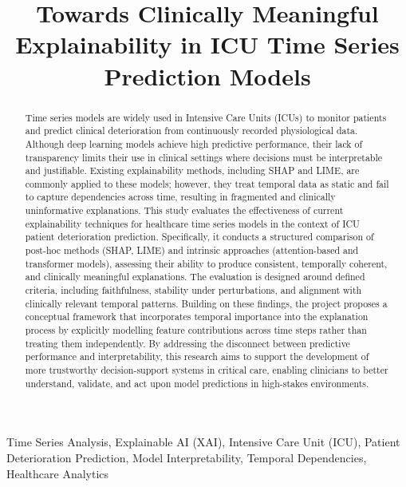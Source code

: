\documentclass[conference]{IEEEtran}
\begin{document}
\title{Towards Clinically Meaningful Explainability in ICU Time Series Prediction Models}

\author{
}

\maketitle

\begin{abstract}
Time series models are widely used in Intensive Care Units (ICUs) to monitor patients and predict clinical deterioration from continuously recorded physiological data. Although deep learning models achieve high predictive performance, their lack of transparency limits their use in clinical settings where decisions must be interpretable and justifiable. Existing explainability methods, including SHAP and LIME, are commonly applied to these models; however, they treat temporal data as static and fail to capture dependencies across time, resulting in fragmented and clinically uninformative explanations.
This study evaluates the effectiveness of current explainability techniques for healthcare time series models in the context of ICU patient deterioration prediction. Specifically, it conducts a structured comparison of post-hoc methods (SHAP, LIME) and intrinsic approaches (attention-based and transformer models), assessing their ability to produce consistent, temporally coherent, and clinically meaningful explanations. The evaluation is designed around defined criteria, including faithfulness, stability under perturbations, and alignment with clinically relevant temporal patterns.
Building on these findings, the project proposes a conceptual framework that incorporates temporal importance into the explanation process by explicitly modelling feature contributions across time steps rather than treating them independently. By addressing the disconnect between predictive performance and interpretability, this research aims to support the development of more trustworthy decision-support systems in critical care, enabling clinicians to better understand, validate, and act upon model predictions in high-stakes environments.
\end{abstract}

\begin{IEEEkeywords}
Time Series Analysis, Explainable AI (XAI), Intensive Care Unit (ICU), Patient Deterioration Prediction, Model Interpretability, Temporal Dependencies, Healthcare Analytics
\end{IEEEkeywords}
\end{document}
